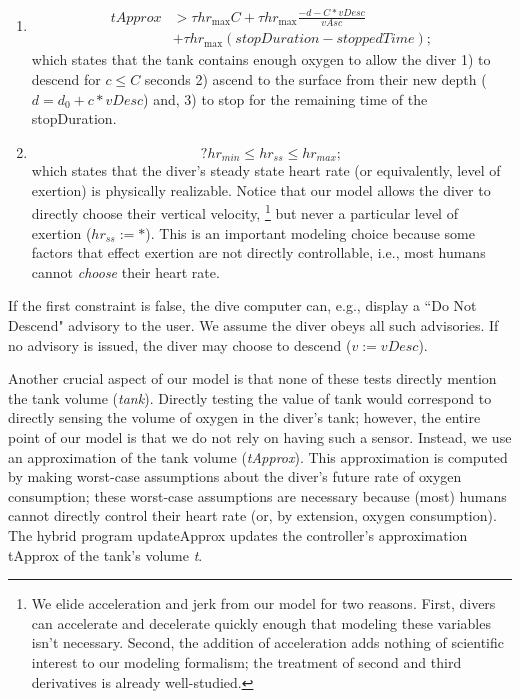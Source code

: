 \documentclass[sigconf,screen]{acmart}
\newcommand{\varheart}{hr}
\newcommand{\vDesc}{\textit{vDesc}}
\newcommand{\vAsc}{\textit{vAsc}}
\newcommand{\tApprox}{\textit{tApprox}}
\newcommand{\iitimes}{{*}}
\begin{document}
\begin{enumerate}
    \item 
        \begin{align*}
            \tApprox &>\tau \varheart_{\text{max}} C + \tau \varheart_{\text{max}}\frac{-d - C \iitimes \vDesc}{\vAsc} \\ &+ \tau \varheart_{\text{max}}(stopDuration - stoppedTime);
        \end{align*}
which states that the tank contains enough oxygen to allow the diver
1) to descend for $c \le C$ seconds
2) ascend to the surface from their new depth ($d = d_0 + c\iitimes\vDesc$) and,
3) to stop for the remaining time of the stopDuration.

    \item 
        $$?\varheart_{min} \le \varheart_{ss} \le \varheart_{max};$$
which states that the diver's steady state heart rate (or equivalently, level of exertion) is physically realizable. 
Notice that our model allows the diver to directly choose their vertical velocity,
\footnote[1]{We elide  acceleration and jerk from our model for two reasons.
First, divers can accelerate and decelerate quickly enough that modeling these variables isn't necessary. Second, the addition of acceleration adds nothing of scientific interest to our modeling formalism; the treatment of second and third derivatives is already well-studied.}
but never a particular level of exertion ($\varheart_{ss} := *$).
This is an important modeling choice because some factors
that effect exertion are not directly controllable, i.e., most humans cannot \emph{choose} their heart rate.
\end{enumerate}
If the first constraint is false, the dive computer can, e.g., display a ``Do Not Descend" advisory to the user.
We assume the diver obeys all such advisories. If no advisory is issued, the diver may choose to descend ($v := \vDesc$).

Another crucial aspect of our model is that none of these tests directly mention the tank volume (\textit{tank}). Directly testing the value of tank would correspond to directly sensing the volume of oxygen in the diver's tank; however, the entire point of our model is that we do not rely on having such a sensor. Instead, we use an approximation of the tank volume (\textit{tApprox}). This approximation is computed by making worst-case assumptions about the diver's future rate of oxygen consumption; these worst-case assumptions are necessary because (most) humans cannot directly control their heart rate (or, by extension, oxygen consumption). The hybrid program updateApprox updates the controller's approximation tApprox of the tank's volume \textit{t}.
\end{document}
